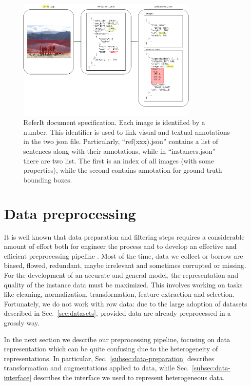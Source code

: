 \begin{figure}
  \centering
  \includegraphics[width=0.8\textwidth]{figures/referit-document-specification.png}
  \caption[ReferIt document specification]{ReferIt document
  specification. Each image is identified by a number. This identifier
  is used to link visual and textual annotations in the two json file.
  Particularly, ``ref(xxx).json'' contains a list of sentences along
  with their annotations, while in ``instances.json'' there are two
  list. The first is an index of all images (with some properties),
  while the second contains annotation for ground truth bounding
  boxes. }
  \label{fig:referit-technical-data-representation}
\end{figure}

\section{Data preprocessing}
\label{sec:data-preprocessing}

It is well known that data preparation and filtering steps requires a
considerable amount of effort both for engineer the process and to
develop an effective and efficient preprocessing pipeline
\cite{kotsiantis2006data}. Most of the time, data we collect or borrow
are biased, flowed, redundant, maybe irrelevant and sometimes
corrupted or missing. For the development of an accurate and general
model, the representation and quality of the instance data must be
maximized. This involves working on tasks like cleaning,
normalization, transformation, feature extraction and selection.
Fortunately, we do not work with row data: due to the large adoption
of datasets described in Sec.~\ref{sec:datasets}, provided data are
already preprocessed in a grossly way.

In the next section we describe our preprocessing pipeline, focusing
on data representation which can be quite confusing due to the
heterogeneity of representations. In particular,
Sec.~\ref{subsec:data-preparation} describes transformation and
augmentations applied to data, while Sec.~\ref{subsec:data-interface}
describes the interface we used to represent heterogeneous data.

